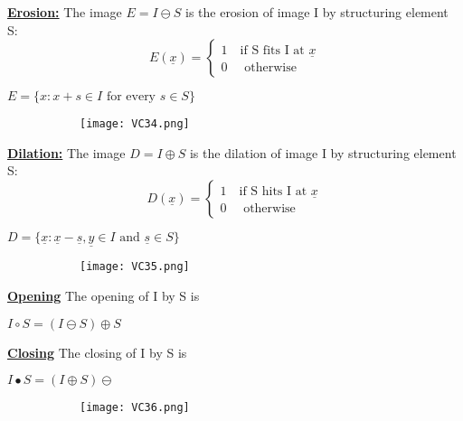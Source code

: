 \documentclass[8pt]{extreport}
\begin{document}
\underline{\textbf{Erosion:}} The image $E = I  \ominus S$ is the erosion of image I by structuring element S:
\[
E(\underline{x}) =
\begin{cases}
1 \quad \text{if S fits I at } \underline{x}\\
0 \quad \text{ otherwise}
\end{cases}
\]
 \begin{center}
$E =\{x:x + s \in I \text{ for every } s \in S\}$
\end{center}
\begin{figure}[H]
\centering
\begin{subfigure}[b]{0.32\linewidth}
\texttt{[image: VC34.png]}
\end{subfigure}
\end{figure}

\underline{\textbf{Dilation:}} The image $D = I  \oplus S$ is the dilation of image I by structuring element S:
\[
D(\underline{x}) =
\begin{cases}
1 \quad \text{if S hits I at } \underline{x}\\
0 \quad \text{ otherwise}
\end{cases}
\]
 \begin{center}
$D =\{\underline{x}:\underline{x} - \underline{ s},\underline{y} \in I \text{ and } \underline{s}  \in S\}$
\end{center}
\begin{figure}[H]
\centering
\begin{subfigure}[b]{0.32\linewidth}
\texttt{[image: VC35.png]}
\end{subfigure}
\end{figure}

\underline{\textbf{Opening}} The opening of I by S is 
\begin{center}
$I \circ S = (I \ominus S) \oplus S$
\end{center}

\underline{\textbf{Closing}} The closing of I by S is
\begin{center}
$I \bullet S =(I \oplus S) \ominus$
\end{center}

\begin{figure}[H]
\centering
\begin{subfigure}[b]{0.32\linewidth}
\texttt{[image: VC36.png]}
\end{subfigure}
\end{figure}
\end{document}
